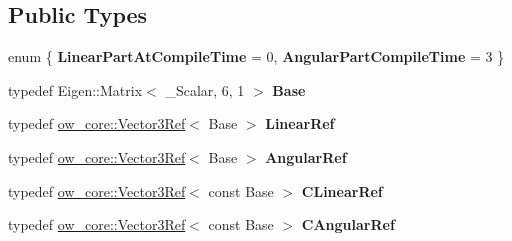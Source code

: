 \subsection*{Public Types}
\begin{DoxyCompactItemize}
\item 
enum \{ {\bfseries Linear\+Part\+At\+Compile\+Time} = 0, 
{\bfseries Angular\+Part\+Compile\+Time} = 3
 \}\hypertarget{structow_1_1traits_3_01ow__core_1_1CartesianVector_3_01__Scalar_01_4_01_4_a5a83898204ce6c15f74cb5620e5cc2b8}{}\label{structow_1_1traits_3_01ow__core_1_1CartesianVector_3_01__Scalar_01_4_01_4_a5a83898204ce6c15f74cb5620e5cc2b8}

\item 
typedef Eigen\+::\+Matrix$<$ \+\_\+\+Scalar, 6, 1 $>$ {\bfseries Base}\hypertarget{structow_1_1traits_3_01ow__core_1_1CartesianVector_3_01__Scalar_01_4_01_4_a2b64d857d40625f35a323c4c6de34561}{}\label{structow_1_1traits_3_01ow__core_1_1CartesianVector_3_01__Scalar_01_4_01_4_a2b64d857d40625f35a323c4c6de34561}

\item 
typedef \hyperlink{classow__core_1_1Vector3Ref}{ow\+\_\+core\+::\+Vector3\+Ref}$<$ Base $>$ {\bfseries Linear\+Ref}\hypertarget{structow_1_1traits_3_01ow__core_1_1CartesianVector_3_01__Scalar_01_4_01_4_afc40368fff085323a6ddbc75ce76aaea}{}\label{structow_1_1traits_3_01ow__core_1_1CartesianVector_3_01__Scalar_01_4_01_4_afc40368fff085323a6ddbc75ce76aaea}

\item 
typedef \hyperlink{classow__core_1_1Vector3Ref}{ow\+\_\+core\+::\+Vector3\+Ref}$<$ Base $>$ {\bfseries Angular\+Ref}\hypertarget{structow_1_1traits_3_01ow__core_1_1CartesianVector_3_01__Scalar_01_4_01_4_aad70e2473a495e02b411c8d42d35e187}{}\label{structow_1_1traits_3_01ow__core_1_1CartesianVector_3_01__Scalar_01_4_01_4_aad70e2473a495e02b411c8d42d35e187}

\item 
typedef \hyperlink{classow__core_1_1Vector3Ref}{ow\+\_\+core\+::\+Vector3\+Ref}$<$ const Base $>$ {\bfseries C\+Linear\+Ref}\hypertarget{structow_1_1traits_3_01ow__core_1_1CartesianVector_3_01__Scalar_01_4_01_4_ae9da69112ef81e6f153e7e30bd0442e3}{}\label{structow_1_1traits_3_01ow__core_1_1CartesianVector_3_01__Scalar_01_4_01_4_ae9da69112ef81e6f153e7e30bd0442e3}

\item 
typedef \hyperlink{classow__core_1_1Vector3Ref}{ow\+\_\+core\+::\+Vector3\+Ref}$<$ const Base $>$ {\bfseries C\+Angular\+Ref}\hypertarget{structow_1_1traits_3_01ow__core_1_1CartesianVector_3_01__Scalar_01_4_01_4_a61ebb16d73b025684c587a0e376ddcb4}{}\label{structow_1_1traits_3_01ow__core_1_1CartesianVector_3_01__Scalar_01_4_01_4_a61ebb16d73b025684c587a0e376ddcb4}

\end{DoxyCompactItemize}


